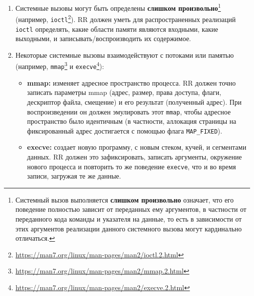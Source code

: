 \begin{enumerate}
  
  \item Системные вызовы могут быть определены \textbf{слишком
  произвольно}\footnote{Системный вызов выполняется \textbf{слишком
  произвольно} означает, что его поведение полностью зависит от переданных ему
  аргументов, в частности от переданного кода команды и указателя на данные, то
  есть в зависимости от этих аргументов реализации данного системного вызова
  могут кардинально отличаться.} (например,
  \texttt{ioctl}\footnote{\url{https://man7.org/linux/man-pages/man2/ioctl.2.html}}).
  RR должен уметь для распространенных реализаций \texttt{ioctl} определять,
  какие области памяти являются входными, какие выходными, и
  записывать/воспроизводить их содержимое.

  \item Некоторые системные вызовы взаимодействуют с потоками или памятью
  (например,
  \texttt{mmap}\footnote{\url{https://man7.org/linux/man-pages/man2/mmap.2.html}}
  и
  \texttt{execve}\footnote{\url{https://man7.org/linux/man-pages/man2/execve.2.html}}):
  
  \begin{itemize}

    \item \textbf{mmap:} изменяет адресное пространство процесса. RR должен
    точно записать параметры mmap (адрес, размер, права доступа, флаги,
    дескриптор файла, смещение) и его результат (полученный адрес). При
    воспроизведении он должен эмулировать этот \texttt{mmap}, чтобы адресное
    пространство было идентичным (в частности, аллокация страницы на
    фиксированный адрес достигается с помощью флага \texttt{MAP\_FIXED}).

    \item \textbf{execve:} создает новую программу, с новым стеком, кучей, и
    сегментами данных. RR должен это зафиксировать, записать аргументы,
    окружение нового процесса и повторить то же поведение \texttt{execve}, что
    и во время записи, загружая те же данные.

  \end{itemize}

\end{enumerate}


